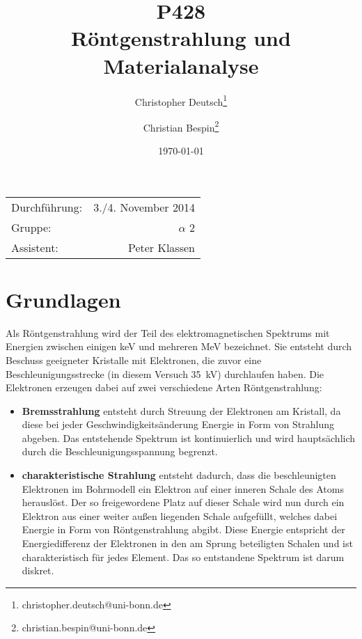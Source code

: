 \documentclass[10pt, a4paper]{article}
\title{P428 \\ Röntgenstrahlung und Materialanalyse}
\author{Christopher Deutsch\footnote{christopher.deutsch@uni-bonn.de} \and Christian Bespin\footnote{christian.bespin@uni-bonn.de}}
\date{\today}
\begin{document}
\maketitle

\begin{center}
\begin{tabular}{l r}
Durchführung: & 3./4. November 2014 \\
Gruppe: & $\alpha$ 2 \\
Assistent: & Peter Klassen
\end{tabular}
\end{center}

\begin{abstract}
\noindent
\end{abstract}

\tableofcontents
\newpage


\section{Grundlagen}
  Als Röntgenstrahlung wird der Teil des elektromagnetischen Spektrums mit Energien zwischen einigen keV und mehreren MeV \cite{demtroeder} bezeichnet.
  Sie entsteht durch Beschuss geeigneter Kristalle mit Elektronen, die zuvor eine Beschleunigungsstrecke (in diesem Versuch \SI{35}{\kilo\volt}) durchlaufen haben.
  Die Elektronen erzeugen dabei auf zwei verschiedene Arten Röntgenstrahlung:
  \begin{itemize}
  \item \textbf{Bremsstrahlung} entsteht durch Streuung der Elektronen am Kristall, da diese bei jeder Geschwindigkeitsänderung Energie in Form von Strahlung abgeben.
  Das entstehende Spektrum ist kontinuierlich und wird hauptsächlich durch die Beschleunigungsspannung begrenzt.
  \item \textbf{charakteristische Strahlung} entsteht dadurch, dass die beschleunigten Elektronen im Bohrmodell ein Elektron auf einer inneren Schale des Atoms herauslöst.
  Der so freigewordene Platz auf dieser Schale wird nun durch ein Elektron aus einer weiter außen liegenden Schale aufgefüllt, welches dabei Energie in Form von Röntgenstrahlung abgibt.
  Diese Energie entspricht der Energiedifferenz der Elektronen in den am Sprung beteiligten Schalen und ist charakteristisch für jedes Element.
  Das so entstandene Spektrum ist darum diskret.
  \end{itemize}
  
\end{document}
